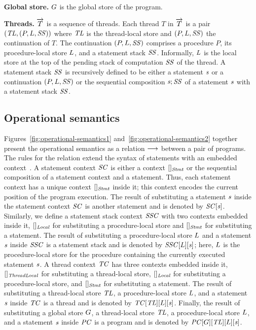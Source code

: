 \noindent
{\bf Global store.}
$G$ is the global store of the program.

\noindent
{\bf Threads.}
$\overrightarrow{T}$ is a sequence of threads.
Each thread $T$ in $\overrightarrow{T}$ is a pair $(\mathit{TL}, (P, L, \mathit{SS}))$ where
$\mathit{TL}$ is the thread-local store and $(P, L, \mathit{SS})$ the continuation of $T$.  
The continuation $(P, L, \mathit{SS})$ comprises a procedure $P$, its procedure-local store $L$, and a statement stack $\mathit{SS}$.
Informally, $L$ is the local store at the top of the pending stack of computation $\mathit{SS}$ of the thread.
A statement stack $\mathit{SS}$ is recursively defined to be either a statement $\mathit{s}$ 
or a continuation $(P,L,\mathit{SS})$ or the sequential composition $\mathit{s};\mathit{SS}$ of a statement $\mathit{s}$ with 
a statement stack $\mathit{SS}$.

\subsection{Operational semantics}
\label{sec:operational-semantics}

Figures~\ref{fig:operational-semantics1} and~\ref{fig:operational-semantics2} together present the operational semantics as a relation 
$\longrightarrow$ between a pair of programs.
The rules for the relation extend the syntax of statements with an embedded context~\cite{WrightF94}.
A statement context $\mathit{SC}$ is either a context $[]_{\mathit{Stmt}}$ or the sequential composition of a 
statement context and a statement.
Thus, each statement context has a unique context $[]_{\mathit{Stmt}}$ inside it;
this context encodes the current position of the program execution.
The result of substituting a statement $\mathit{s}$ inside the statement context $\mathit{SC}$ is another statement and is denoted by $\mathit{SC}[\mathit{s}]$.
Similarly, we define a statement stack context $\mathit{SSC}$ with two contexts embedded inside it, $[]_{\mathit{Local}}$ for substituting a procedure-local store
and $[]_{\mathit{Stmt}}$ for substituting a statement.
The result of substituting a procedure-local store $L$ and a statement $\mathit{s}$ inside 
$\mathit{SSC}$ is a statement stack and is denoted by $\mathit{SSC}[L][\mathit{s}]$;
here, $L$ is the procedure-local store for the procedure containing the currently executed statement $\mathit{s}$.
A thread context $\mathit{TC}$ has three contexts embedded inside it, $[]_{\mathit{ThreadLocal}}$ for substituting a thread-local store, 
$[]_{\mathit{Local}}$ for substituting a procedure-local store, and $[]_{\mathit{Stmt}}$ for substituting a statement.
The result of substituting a thread-local store $\mathit{TL}$, a procedure-local store $L$, and a statement $\mathit{s}$ inside $\mathit{TC}$ 
is a thread and is denoted by $\mathit{TC}[\mathit{TL}][L][\mathit{s}]$.
Finally, the result of substituting a global store $G$, a thread-local store $\mathit{TL}$, a procedure-local store $L$, and a statement $\mathit{s}$ inside $\mathit{PC}$ is a program and is denoted by $\mathit{PC}[G][\mathit{TL}][L][\mathit{s}]$.

